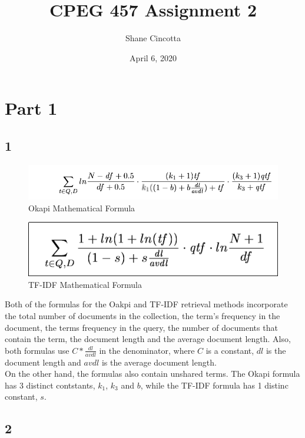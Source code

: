 \documentclass{article}
\title{CPEG 457 Assignment 2}
\author{Shane Cincotta }
\date{April 6, 2020}
\begin{document}
\maketitle

\section*{Part 1}
\subsection*{1}
\begin{figure}[h!]
\centering
\includegraphics[scale=0.35]{Okapi_FORMULA_MATH.png}
\caption{Okapi Mathematical Formula}
\end{figure}

\begin{figure}[h!]
\centering
\includegraphics[scale=0.35]{TF_IDF_FORMULA_MATH.png}
\caption{TF-IDF Mathematical Formula}
\end{figure}

Both of the formulas for the Oakpi and TF-IDF retrieval methods incorporate the total number of documents in the collection, the term's frequency in the document, the terms frequency in the query, the number of documents that contain the term, the document length and the average document length.  Also, both formulas use $C*\frac{dl}{avdl}$ in the denominator, where $C$ is a constant, $dl$ is the document length and $avdl$ is the average document length.\\
\newline On the other hand, the formulas also contain unshared terms.  The Okapi formula has 3 distinct contstants, $k_1$, $k_3$ and $b$, while the TF-IDF formula has 1 distinc constant, $s$.\\
\subsection*{2}
\end{document}
